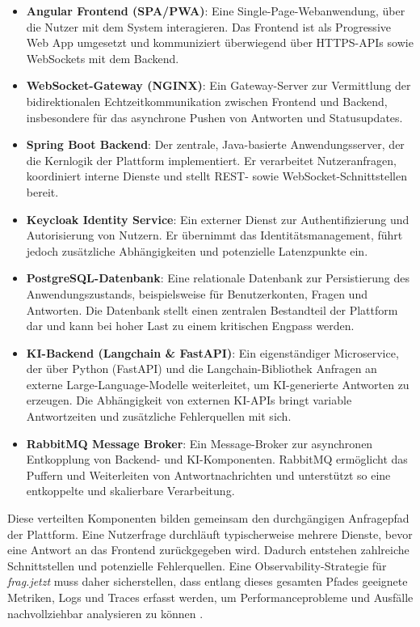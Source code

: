 \begin{itemize}
\item \textbf{Angular Frontend (SPA/PWA)}: Eine Single-Page-Webanwendung, über die Nutzer mit dem System interagieren. Das Frontend ist als Progressive Web App umgesetzt und kommuniziert überwiegend über HTTPS-APIs sowie WebSockets mit dem Backend.
\item \textbf{WebSocket-Gateway (NGINX)}: Ein Gateway-Server zur Vermittlung der bidirektionalen Echtzeitkommunikation zwischen Frontend und Backend, insbesondere für das asynchrone Pushen von Antworten und Statusupdates.
\item \textbf{Spring Boot Backend}: Der zentrale, Java-basierte Anwendungsserver, der die Kernlogik der Plattform implementiert. Er verarbeitet Nutzeranfragen, koordiniert interne Dienste und stellt REST- sowie WebSocket-Schnittstellen bereit.
\item \textbf{Keycloak Identity Service}: Ein externer Dienst zur Authentifizierung und Autorisierung von Nutzern. Er übernimmt das Identitätsmanagement, führt jedoch zusätzliche Abhängigkeiten und potenzielle Latenzpunkte ein.
\item \textbf{PostgreSQL-Datenbank}: Eine relationale Datenbank zur Persistierung des Anwendungszustands, beispielsweise für Benutzerkonten, Fragen und Antworten. Die Datenbank stellt einen zentralen Bestandteil der Plattform dar und kann bei hoher Last zu einem kritischen Engpass werden.
\item \textbf{KI-Backend (Langchain \& FastAPI)}: Ein eigenständiger Microservice, der über Python (FastAPI) und die Langchain-Bibliothek Anfragen an externe Large-Language-Modelle weiterleitet, um KI-generierte Antworten zu erzeugen. Die Abhängigkeit von externen KI-APIs bringt variable Antwortzeiten und zusätzliche Fehlerquellen mit sich.
\item \textbf{RabbitMQ Message Broker}: Ein Message-Broker zur asynchronen Entkopplung von Backend- und KI-Komponenten. RabbitMQ ermöglicht das Puffern und Weiterleiten von Antwortnachrichten und unterstützt so eine entkoppelte und skalierbare Verarbeitung.
\end{itemize}

Diese verteilten Komponenten bilden gemeinsam den durchgängigen Anfragepfad der Plattform. Eine Nutzerfrage durchläuft typischerweise mehrere Dienste, bevor eine Antwort an das Frontend zurückgegeben wird. Dadurch entstehen zahlreiche Schnittstellen und potenzielle Fehlerquellen. Eine Observability-Strategie für \textit{frag.jetzt} muss daher sicherstellen, dass entlang dieses gesamten Pfades geeignete Metriken, Logs und Traces erfasst werden, um Performanceprobleme und Ausfälle nachvollziehbar analysieren zu können \cite{faseeha2025observability}.


